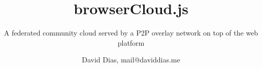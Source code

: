 \documentclass[9.5pt,twocolumn]{./llncs2e/llncs}
\begin{document}
\title{browserCloud.js}

\subtitle{A federated community cloud served by a P2P overlay network on top of the web platform}
\author{David Dias, mail@daviddias.me 
}



\maketitle












%
%
\tiny


\end{document}
